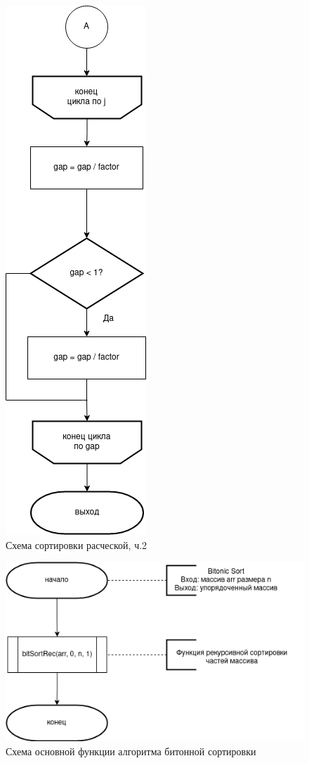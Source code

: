 \documentclass[12pt]{report}
\begin{document}
	\begin{figure}[H]
		\centering
		\includegraphics[width=0.35\linewidth]{combSort_2}
		\caption{Схема сортировки расческой, ч.2}
		\label{fig:schema_selection}
	\end{figure}
	
	\begin{figure}[H]
		\centering
		\includegraphics{bitonic_1}
		\caption{Схема основной функции алгоритма битонной сортировки}
		\label{fig:schema_insertion}
	\end{figure}
	
\end{document}
